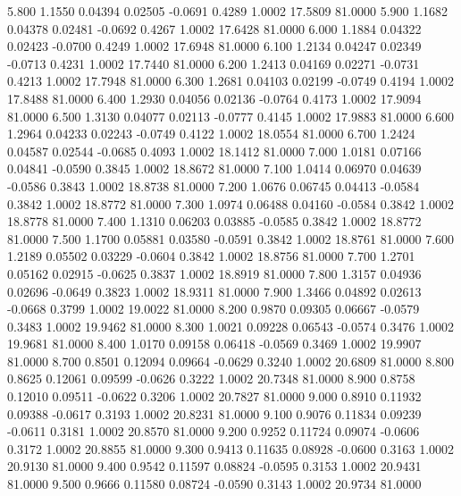    5.800   1.1550   0.04394   0.02505  -0.0691   0.4289   1.0002  17.5809  81.0000
   5.900   1.1682   0.04378   0.02481  -0.0692   0.4267   1.0002  17.6428  81.0000
   6.000   1.1884   0.04322   0.02423  -0.0700   0.4249   1.0002  17.6948  81.0000
   6.100   1.2134   0.04247   0.02349  -0.0713   0.4231   1.0002  17.7440  81.0000
   6.200   1.2413   0.04169   0.02271  -0.0731   0.4213   1.0002  17.7948  81.0000
   6.300   1.2681   0.04103   0.02199  -0.0749   0.4194   1.0002  17.8488  81.0000
   6.400   1.2930   0.04056   0.02136  -0.0764   0.4173   1.0002  17.9094  81.0000
   6.500   1.3130   0.04077   0.02113  -0.0777   0.4145   1.0002  17.9883  81.0000
   6.600   1.2964   0.04233   0.02243  -0.0749   0.4122   1.0002  18.0554  81.0000
   6.700   1.2424   0.04587   0.02544  -0.0685   0.4093   1.0002  18.1412  81.0000
   7.000   1.0181   0.07166   0.04841  -0.0590   0.3845   1.0002  18.8672  81.0000
   7.100   1.0414   0.06970   0.04639  -0.0586   0.3843   1.0002  18.8738  81.0000
   7.200   1.0676   0.06745   0.04413  -0.0584   0.3842   1.0002  18.8772  81.0000
   7.300   1.0974   0.06488   0.04160  -0.0584   0.3842   1.0002  18.8778  81.0000
   7.400   1.1310   0.06203   0.03885  -0.0585   0.3842   1.0002  18.8772  81.0000
   7.500   1.1700   0.05881   0.03580  -0.0591   0.3842   1.0002  18.8761  81.0000
   7.600   1.2189   0.05502   0.03229  -0.0604   0.3842   1.0002  18.8756  81.0000
   7.700   1.2701   0.05162   0.02915  -0.0625   0.3837   1.0002  18.8919  81.0000
   7.800   1.3157   0.04936   0.02696  -0.0649   0.3823   1.0002  18.9311  81.0000
   7.900   1.3466   0.04892   0.02613  -0.0668   0.3799   1.0002  19.0022  81.0000
   8.200   0.9870   0.09305   0.06667  -0.0579   0.3483   1.0002  19.9462  81.0000
   8.300   1.0021   0.09228   0.06543  -0.0574   0.3476   1.0002  19.9681  81.0000
   8.400   1.0170   0.09158   0.06418  -0.0569   0.3469   1.0002  19.9907  81.0000
   8.700   0.8501   0.12094   0.09664  -0.0629   0.3240   1.0002  20.6809  81.0000
   8.800   0.8625   0.12061   0.09599  -0.0626   0.3222   1.0002  20.7348  81.0000
   8.900   0.8758   0.12010   0.09511  -0.0622   0.3206   1.0002  20.7827  81.0000
   9.000   0.8910   0.11932   0.09388  -0.0617   0.3193   1.0002  20.8231  81.0000
   9.100   0.9076   0.11834   0.09239  -0.0611   0.3181   1.0002  20.8570  81.0000
   9.200   0.9252   0.11724   0.09074  -0.0606   0.3172   1.0002  20.8855  81.0000
   9.300   0.9413   0.11635   0.08928  -0.0600   0.3163   1.0002  20.9130  81.0000
   9.400   0.9542   0.11597   0.08824  -0.0595   0.3153   1.0002  20.9431  81.0000
   9.500   0.9666   0.11580   0.08724  -0.0590   0.3143   1.0002  20.9734  81.0000
